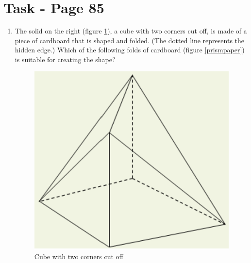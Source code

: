 \documentclass[12pt,titlepage]{article}
\begin{document}
\section{Task - Page 85}
\begin{enumerate}
    \item {
        The solid on the right (figure \ref{prism}), a cube with two corners cut off, is made of a piece of cardboard
        that is shaped and folded. (The dotted line represents the hidden edge.)
        Which of the following folds of cardboard (figure \ref{prismpaper}) is suitable for creating the shape?

        \begin{figure}[h]
            \centering
            \begin{minipage}{.4\textwidth}
                \centering
                \includegraphics[width=\textwidth]{./images/prism.png}
                \caption{Cube with two corners cut off}
                \label{prism}
            \end{minipage}
            \hspace{0.5cm}
            \begin{minipage}{.4\textwidth}
                \centering

\end{minipage}
\end{figure}}
\end{enumerate}
\end{document}
